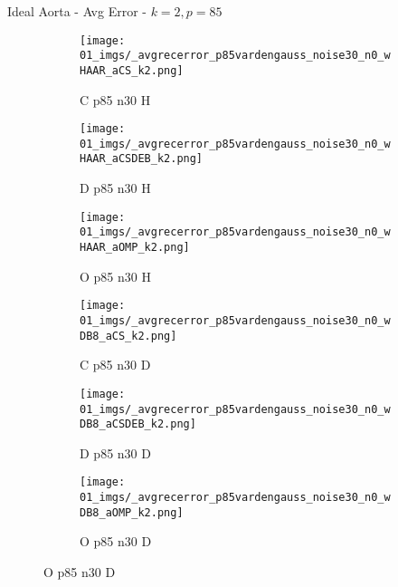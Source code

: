 \begin{frame}{Ideal Aorta - Avg Error - $k=2,p=85$}{}
\begin{figure}
\begin{subfigure}{0.13\textwidth}
\texttt{[image: 01\_imgs/\_avgrecerror\_p85vardengauss\_noise30\_n0\_wHAAR\_aCS\_k2.png]}
\caption*{\tiny C p85 n30 H}
\end{subfigure}
\begin{subfigure}{0.13\textwidth}
\texttt{[image: 01\_imgs/\_avgrecerror\_p85vardengauss\_noise30\_n0\_wHAAR\_aCSDEB\_k2.png]}
\caption*{\tiny D p85 n30 H}
\end{subfigure}
\begin{subfigure}{0.13\textwidth}
\texttt{[image: 01\_imgs/\_avgrecerror\_p85vardengauss\_noise30\_n0\_wHAAR\_aOMP\_k2.png]}
\caption*{\tiny O p85 n30 H}
\end{subfigure}
\begin{subfigure}{0.13\textwidth}
\texttt{[image: 01\_imgs/\_avgrecerror\_p85vardengauss\_noise30\_n0\_wDB8\_aCS\_k2.png]}
\caption*{\tiny C p85 n30 D}
\end{subfigure}
\begin{subfigure}{0.13\textwidth}
\texttt{[image: 01\_imgs/\_avgrecerror\_p85vardengauss\_noise30\_n0\_wDB8\_aCSDEB\_k2.png]}
\caption*{\tiny D p85 n30 D}
\end{subfigure}
\begin{subfigure}{0.13\textwidth}
\texttt{[image: 01\_imgs/\_avgrecerror\_p85vardengauss\_noise30\_n0\_wDB8\_aOMP\_k2.png]}
\caption*{\tiny O p85 n30 D}
\end{subfigure}
\end{figure}
\end{frame}


